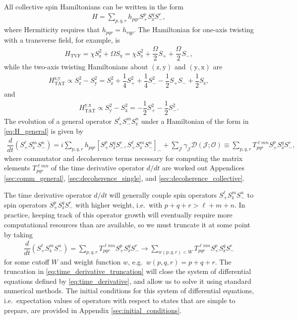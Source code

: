 \documentclass[aps,notitlepage,nofootinbib,11pt]{revtex4-1}
\renewcommand{\t}{\text} %
\newcommand{\f}[2]{\dfrac{#1}{#2}} %
\newcommand{\p}[1]{\left(#1\right)} %
\renewcommand{\sp}[1]{\left[#1\right]} %
\newcommand{\D}{\mathcal{D}}
\newcommand{\J}{\mathcal{J}}
\renewcommand{\O}{\mathcal{O}}
\newcommand{\z}{\text{z}}
\newcommand{\x}{\text{x}}
\newcommand{\y}{\text{y}}
\newcommand{\1}{\mathds{1}}
\begin{document}
All collective spin Hamiltonians can be written in the form
\begin{align}
  H = \sum_{p,q,r} h_{pqr} S_+^p S_\z^q S_-^r,
  \label{eq:H_general}
\end{align}
where Hermiticity requires that $h_{pqr}=h_{rqp}$.  The Hamiltonian
for one-axis twisting with a transverse field, for example, is
\begin{align}
  H_{\t{TVF}}
  = \chi S_\z^2 + \Omega S_\x
  = \chi S_\z^2 + \f{\Omega}{2} S_+ + \f{\Omega}{2} S_-,
\end{align}
while the two-axis twisting Hamiltonians about $\p{\z,\y}$ and
$\p{\y,\x}$ are
\begin{align}
  H_{\t{TAT}}^{\z,\y}
  \propto S_\z^2 - S_\y^2
  = S_\z^2 + \f14 S_+^2 + \f14 S_-^2
  - \f12 S_+ S_- + \f12 S_\z,
\end{align}
and
\begin{align}
  H_{\t{TAT}}^{\y,\x}
  \propto S_\y^2 - S_\x^2
  = -\f12 S_+^2 - \f12 S_-^2.
\end{align}
The evolution of a general operator $S_+^\ell S_-^m S_\z^n$ under a
Hamiltonian of the form in \eqref{eq:H_general} is given by
\begin{align}
  \f{d}{dt} \p{S_+^\ell S_\z^m S_-^n}
  = i \sum_{p,q,r} h_{pqr}
  \sp{S_+^p S_\z^q S_-^r, S_+^\ell S_\z^m S_-^n}_-
  + \sum_\J \gamma_\J \D\p{\J;\O}
  \equiv \sum_{p,q,r} T^{\ell m n}_{pqr} S_+^p S_\z^q S_-^r,
  \label{eq:time_derivative}
\end{align}
where commutator and decoherence terms necessary for computing the
matrix elements $T^{\ell m n}_{pqr}$ of the time derivative operator
$d/dt$ are worked out Appendices \ref{sec:comm_general},
\ref{sec:decoherence_single}, and \ref{sec:decoherence_collective}.

The time derivative operator $d/dt$ will generally couple spin
operators $S_+^\ell S_\z^m S_-^n$ to spin operators
$S_+^p S_\z^q S_-^r$ with higher weight, i.e.~with $p+q+r>\ell+m+n$.
In practice, keeping track of this operator growth will eventually
require more computational resources than are available, so we must
truncate it at some point by taking
\begin{align}
  \f{d}{dt} \p{S_+^\ell S_\z^m S_-^n}
  = \sum_{p,q,r} T^{\ell m n}_{pqr} S_+^p S_\z^q S_-^r
  \to \sum_{w\p{p,q,r}<W} T^{\ell m n}_{pqr} S_+^p S_\z^q S_-^r
  \label{eq:time_derivative_truncation}
\end{align}
for some cutoff $W$ and weight function $w$, e.g.~$w\p{p,q,r}=p+q+r$.
The truncation in \eqref{eq:time_derivative_truncation} will close the
system of differential equations defined by
\eqref{eq:time_derivative}, and allow us to solve it using standard
numerical methods.  The initial conditions for this system of
differential equations, i.e.~expectation values of operators with
respect to states that are simple to prepare, are provided in Appendix
\ref{sec:initial_conditions}.
\end{document}
